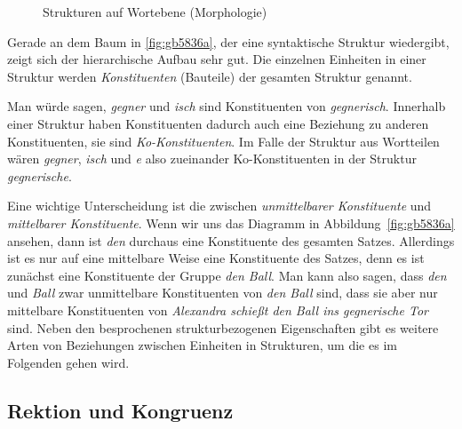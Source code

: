 \begin{figure}
  \centering
  \caption{Strukturen auf Wortebene (Morphologie)}
  \label{fig:gb5836b}
\end{figure}

\enlargethispage{1\baselineskip}
Gerade an dem Baum in \ref{fig:gb5836a}, der eine syntaktische Struktur wiedergibt, zeigt sich der hierarchische Aufbau sehr gut.
Die einzelnen Einheiten in einer Struktur werden \textit{Konstituenten} (Bauteile) der gesamten Struktur genannt.

\newpage


Man würde sagen, \textit{gegner} und \textit{isch} sind Konstituenten von \textit{gegnerisch}.
Innerhalb einer Struktur haben Konstituenten dadurch auch eine Beziehung zu anderen Konstituenten, sie sind \textit{Ko-Konstituenten}.
Im Falle der Struktur aus Wortteilen wären \textit{gegner}, \textit{isch} und \textit{e} also zueinander Ko-Konstituenten in der Struktur \textit{gegnerische}.


Eine wichtige Unterscheidung ist die zwischen \textit{unmittelbarer Konstituente} und \textit{mittelbarer Konstituente}.
Wenn wir uns das Diagramm in Abbildung~\ref{fig:gb5836a} ansehen, dann ist \textit{den} durchaus eine Konstituente des gesamten Satzes.
Allerdings ist es nur auf eine mittelbare Weise eine Konstituente des Satzes, denn es ist zunächst eine Konstituente der Gruppe \textit{den Ball}.
Man kann also sagen, dass \textit{den} und \textit{Ball} zwar unmittelbare Konstituenten von \textit{den Ball} sind, dass sie aber nur mittelbare Konstituenten von \textit{Alexandra schießt den Ball ins gegnerische Tor} sind.
Neben den besprochenen strukturbezogenen Eigenschaften gibt es weitere Arten von Beziehungen zwischen Einheiten in Strukturen, um die es im Folgenden gehen wird.

\subsection{Rektion und Kongruenz}


